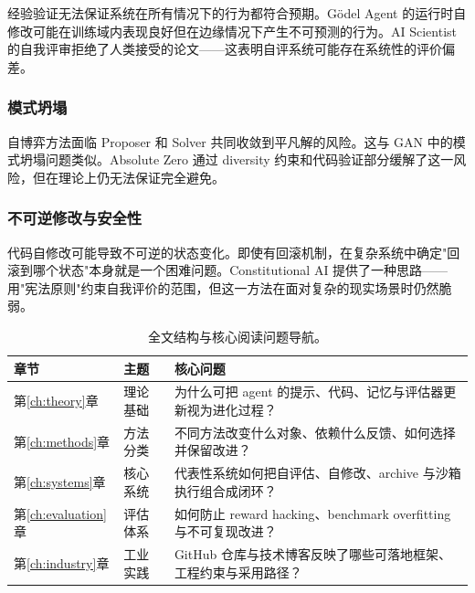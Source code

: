 经验验证无法保证系统在所有情况下的行为都符合预期。Gödel Agent 的运行时自修改可能在训练域内表现良好但在边缘情况下产生不可预测的行为。AI Scientist 的自我评审拒绝了人类接受的论文——这表明自评系统可能存在系统性的评价偏差。

\subsubsection{模式坍塌}

自博弈方法面临 Proposer 和 Solver 共同收敛到平凡解的风险。这与 GAN 中的模式坍塌问题类似。Absolute Zero 通过 diversity 约束和代码验证部分缓解了这一风险，但在理论上仍无法保证完全避免。

\subsubsection{不可逆修改与安全性}

代码自修改可能导致不可逆的状态变化。即使有回滚机制，在复杂系统中确定"回滚到哪个状态"本身就是一个困难问题。Constitutional AI 提供了一种思路——用"宪法原则"约束自我评价的范围，但这一方法在面对复杂的现实场景时仍然脆弱。

\begin{table}[htbp]
\centering
\small
\caption{全文结构与核心阅读问题导航。}
\label{tab:ch1-roadmap}
\begin{tabular}{p{}p{}p{}}
\toprule
章节 & 主题 & 核心问题 \\
\midrule
第\ref{ch:theory}章 & 理论基础 & 为什么可把 agent 的提示、代码、记忆与评估器更新视为进化过程？ \\
第\ref{ch:methods}章 & 方法分类 & 不同方法改变什么对象、依赖什么反馈、如何选择并保留改进？ \\
第\ref{ch:systems}章 & 核心系统 & 代表性系统如何把自评估、自修改、archive 与沙箱执行组合成闭环？ \\
第\ref{ch:evaluation}章 & 评估体系 & 如何防止 reward hacking、benchmark overfitting 与不可复现改进？ \\
第\ref{ch:industry}章 & 工业实践 & GitHub 仓库与技术博客反映了哪些可落地框架、工程约束与采用路径？ \\
\bottomrule
\end{tabular}
\end{table}

